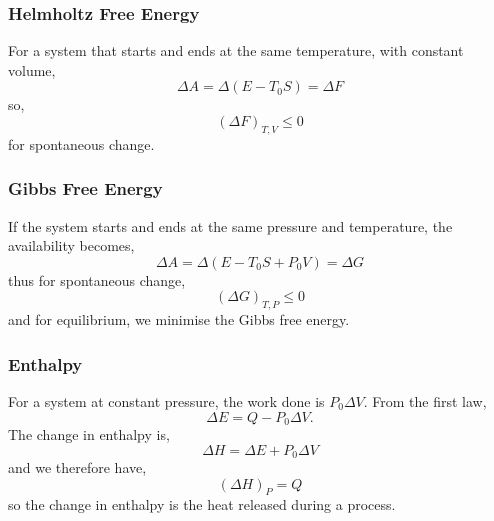 \documentclass{book}
\begin{document}
\subsubsection{Helmholtz Free Energy}
For a system that starts and ends at the same temperature, with constant volume,
\begin{equation}
	\Delta A = \Delta (E - T_0 S) = \Delta F
\end{equation}
so,
\begin{equation}
	(\Delta F)_{T,V} \leq 0
\end{equation}
for spontaneous change.
\subsubsection{Gibbs Free Energy}
If the system starts and ends at the same pressure and temperature, the availability becomes,
\begin{equation}
	\Delta A = \Delta (E - T_0S + P_0V) = \Delta G
\end{equation}
thus for spontaneous change,
\begin{equation}
	(\Delta G)_{T,P} \leq 0
\end{equation}
and for equilibrium, we minimise the Gibbs free energy.
\subsubsection{Enthalpy}
For a system at constant pressure, the work done is $P_0\Delta V$. From the first law,
\begin{equation}
	\Delta E = Q - P_0 \Delta V.
\end{equation}
The change in enthalpy is,
\begin{equation}
	\Delta H = \Delta E + P_0 \Delta V
\end{equation}
and we therefore have,
\begin{equation}
	(\Delta H)_P = Q
\end{equation}
so the change in enthalpy is the heat released during a process.
\end{document}
